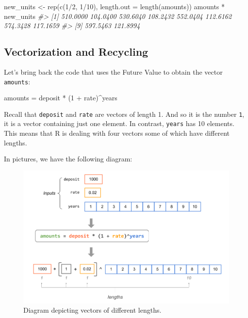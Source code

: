 \documentclass[
]{book}
\newenvironment{Shaded}{\begin{snugshade}}{\end{snugshade}}
\newcommand{\AttributeTok}[1]{\textcolor[rgb]{0.77,0.63,0.00}{#1}}
\newcommand{\CommentTok}[1]{\textcolor[rgb]{0.56,0.35,0.01}{\textit{#1}}}
\newcommand{\DecValTok}[1]{\textcolor[rgb]{0.00,0.00,0.81}{#1}}
\newcommand{\FunctionTok}[1]{\textcolor[rgb]{0.00,0.00,0.00}{#1}}
\newcommand{\NormalTok}[1]{#1}
\newcommand{\OtherTok}[1]{\textcolor[rgb]{0.56,0.35,0.01}{#1}}
\newcommand{\SpecialCharTok}[1]{\textcolor[rgb]{0.00,0.00,0.00}{#1}}
\begin{document}
\begin{Shaded}
\begin{Highlighting}[]
\NormalTok{new\_units }\OtherTok{\textless{}{-}} \FunctionTok{rep}\NormalTok{(}\FunctionTok{c}\NormalTok{(}\DecValTok{1}\SpecialCharTok{/}\DecValTok{2}\NormalTok{, }\DecValTok{1}\SpecialCharTok{/}\DecValTok{10}\NormalTok{), }\AttributeTok{length.out =} \FunctionTok{length}\NormalTok{(amounts))}
\NormalTok{amounts }\SpecialCharTok{*}\NormalTok{ new\_units}
\CommentTok{\#\textgreater{}  [1] 510.0000 104.0400 530.6040 108.2432 552.0404 112.6162 574.3428 117.1659}
\CommentTok{\#\textgreater{}  [9] 597.5463 121.8994}
\end{Highlighting}
\end{Shaded}

\hypertarget{vectorization-and-recycling}{%
\subsection{Vectorization and Recycling}\label{vectorization-and-recycling}}

Let's bring back the code that uses the Future Value to obtain the vector
\texttt{amounts}:

\begin{Shaded}
\begin{Highlighting}[]
\NormalTok{amounts }\OtherTok{=}\NormalTok{ deposit }\SpecialCharTok{*}\NormalTok{ (}\DecValTok{1} \SpecialCharTok{+}\NormalTok{ rate)}\SpecialCharTok{\^{}}\NormalTok{years}
\end{Highlighting}
\end{Shaded}

Recall that \texttt{deposit} and \texttt{rate} are vectors of length 1. And so it is the
number \texttt{1}, it is a vector containing just one element. In contrast, \texttt{years}
has 10 elements. This means that R is dealing with four vectors some of which
have different lengths.

In pictures, we have the following diagram:

\begin{figure}

{\centering \includegraphics[width=0.9\linewidth]{images/vectors/vectorized1} 

}

\caption{Diagram depicting vectors of different lengths.}\label{fig:unnamed-chunk-76}
\end{figure}
\end{document}
